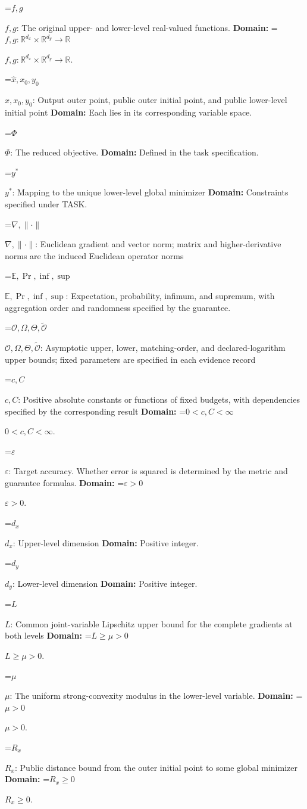 \documentclass[10pt,a4paper]{article}
\newcommand{\AtlasMath}[1]{\par\begingroup\centering\setbox0=\hbox{$\displaystyle #1$}\ifdim\wd0>1.4\linewidth\typeout{ATLAS WIDE FORMULA: \the\wd0}\fi\ifdim\wd0>\linewidth\resizebox{\linewidth}{!}{\box0}\else\box0\fi\par\endgroup}
\newcommand{\AtlasInlineMath}[1]{\begingroup\setbox0=\hbox{$#1$}\ifdim\wd0>.4\linewidth\endgroup\AtlasMath{#1}\else\endgroup$#1$\fi}
\begin{document}
\AtlasInlineMath{f,g}: The original upper- and lower-level real-valued functions. \textbf{Domain:} \AtlasInlineMath{f,g:\mathbb R^{d_x}\times\mathbb R^{d_y}\to\mathbb R}.

\AtlasInlineMath{\widehat x,x_0,y_0}: Output outer point, public outer initial point, and public lower-level initial point \textbf{Domain:} Each lies in its corresponding variable space.

\AtlasInlineMath{\Phi}: The reduced objective. \textbf{Domain:} Defined in the task specification.

\AtlasInlineMath{y^*}: Mapping to the unique lower-level global minimizer \textbf{Domain:} Constraints specified under TASK.

\AtlasInlineMath{\nabla,\|\cdot\|}: Euclidean gradient and vector norm; matrix and higher-derivative norms are the induced Euclidean operator norms

\AtlasInlineMath{\mathbb E,\Pr,\inf,\sup}: Expectation, probability, infimum, and supremum, with aggregation order and randomness specified by the guarantee.

\AtlasInlineMath{\mathcal O,\Omega,\Theta,\widetilde{\mathcal O}}: Asymptotic upper, lower, matching-order, and declared-logarithm upper bounds; fixed parameters are specified in each evidence record

\AtlasInlineMath{c,C}: Positive absolute constants or functions of fixed budgets, with dependencies specified by the corresponding result \textbf{Domain:} \AtlasInlineMath{0<c,C<\infty}.

\AtlasInlineMath{\varepsilon}: Target accuracy. Whether error is squared is determined by the metric and guarantee formulas. \textbf{Domain:} \AtlasInlineMath{\varepsilon>0}.

\AtlasInlineMath{d_x}: Upper-level dimension \textbf{Domain:} Positive integer.

\AtlasInlineMath{d_y}: Lower-level dimension \textbf{Domain:} Positive integer.

\AtlasInlineMath{L}: Common joint-variable Lipschitz upper bound for the complete gradients at both levels \textbf{Domain:} \AtlasInlineMath{L\ge\mu>0}.

\AtlasInlineMath{\mu}: The uniform strong-convexity modulus in the lower-level variable. \textbf{Domain:} \AtlasInlineMath{\mu>0}.

\AtlasInlineMath{R_x}: Public distance bound from the outer initial point to some global minimizer \textbf{Domain:} \AtlasInlineMath{R_x\ge0}.
\end{document}
